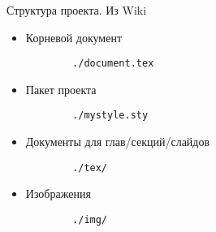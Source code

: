 \begin{frame}[fragile]{Структура проекта. Из Wiki}
  \begin{itemize}
    \item Корневой документ
      \begin{verbatim}
        ./document.tex
      \end{verbatim}
    \pause  
    \item Пакет проекта
      \begin{verbatim}
        ./mystyle.sty
      \end{verbatim}
    \pause  
    \item Документы для глав/секций/слайдов
      \begin{verbatim}
        ./tex/
      \end{verbatim}
    \pause  
    \item Изображения
      \begin{verbatim}
        ./img/
      \end{verbatim}
  \end{itemize}
\end{frame}
